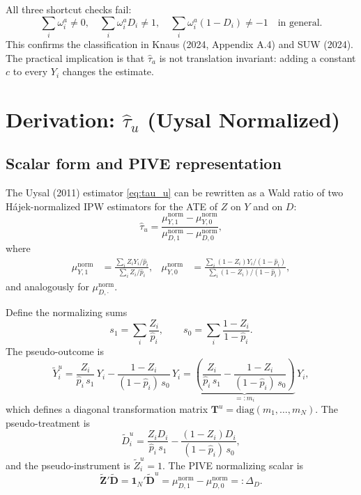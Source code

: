 \documentclass[12pt, a4paper]{article}
\theoremstyle{condstyle}
\theoremstyle{plain}
\newcommand{\bone}{\mathbf{1}_N}
\newcommand{\tY}{\tilde{Y}}
\newcommand{\tD}{\tilde{D}}
\newcommand{\tZ}{\tilde{Z}}
\newcommand{\that}[1]{\hat{\tau}_{#1}}
\newcommand{\phat}{\hat{p}}
\begin{document}
\begin{keyresult}[$\that{a}$ is fully unnormalized]
All three shortcut checks fail:
\[
  \sum_i \omega_i^a \neq 0,\quad
  \sum_i \omega_i^a D_i \neq 1,\quad
  \sum_i \omega_i^a (1-D_i) \neq -1 \quad\text{in general}.
\]
This confirms the classification in Knaus (2024, Appendix A.4) and SUW (2024).
The practical implication is that $\that{a}$ is not translation invariant:
adding a constant $c$ to every $Y_i$ changes the estimate.
\end{keyresult}

\section{Derivation: \texorpdfstring{$\hat\tau_u$}{tau\_u} (Uysal Normalized)}
\label{sec:tau_u}

\subsection{Scalar form and PIVE representation}

The Uysal (2011) estimator \eqref{eq:tau_u} can be rewritten as a Wald ratio
of two Hájek-normalized IPW estimators for the ATE of $Z$ on $Y$ and on $D$:
\begin{equation}
  \that{u}
  = \frac{\mu_{Y,1}^{\mathrm{norm}} - \mu_{Y,0}^{\mathrm{norm}}}%
         {\mu_{D,1}^{\mathrm{norm}} - \mu_{D,0}^{\mathrm{norm}}},
  \label{eq:tau_u_wald}
\end{equation}
where
\begin{align*}
  \mu_{Y,1}^{\mathrm{norm}} &= \frac{\sum_i Z_i Y_i/\phat_i}{\sum_i Z_i/\phat_i},
  &
  \mu_{Y,0}^{\mathrm{norm}} &= \frac{\sum_i (1-Z_i)Y_i/(1-\phat_i)}{\sum_i (1-Z_i)/(1-\phat_i)},
\end{align*}
and analogously for $\mu_{D,\cdot}^{\mathrm{norm}}$.

Define the normalizing sums
\[
  s_1 = \sum_i \frac{Z_i}{\phat_i},\qquad s_0 = \sum_i \frac{1-Z_i}{1-\phat_i}.
\]
The pseudo-outcome is
\begin{equation}
  \tY_i^u = \frac{Z_i}{\phat_i\,s_1}\,Y_i - \frac{1-Z_i}{(1-\phat_i)\,s_0}\,Y_i
           = \underbrace{\left(\frac{Z_i}{\phat_i\,s_1} - \frac{1-Z_i}{(1-\phat_i)\,s_0}\right)}_{=:m_i}\,Y_i,
\end{equation}
which defines a diagonal transformation matrix
$\mathbf{T}^u = \mathrm{diag}(m_1,\ldots,m_N)$.
The pseudo-treatment is
\[
  \tD_i^u = \frac{Z_i D_i}{\phat_i\,s_1} - \frac{(1-Z_i)D_i}{(1-\phat_i)\,s_0},
\]
and the pseudo-instrument is $\tZ_i^u = 1$.
The PIVE normalizing scalar is
\[
  \tilde{\mathbf{Z}}'\tilde{\mathbf{D}} = \bone'\tilde{\mathbf{D}}^u
  = \mu_{D,1}^{\mathrm{norm}} - \mu_{D,0}^{\mathrm{norm}} =: \Delta_D.
\]
\end{document}
